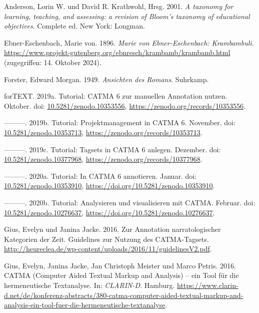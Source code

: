 \documentclass[
          a4paper,
        ]{article}
\newlength{\cslhangindent}
\newenvironment{CSLReferences}[2] %
 {\begin{list}{}{%
  \setlength{\itemindent}{0pt}
  \setlength{\leftmargin}{0pt}
  \setlength{\parsep}{0pt}
  \ifodd #1
   \setlength{\leftmargin}{\cslhangindent}
   \setlength{\itemindent}{-1\cslhangindent}
  \fi
  \setlength{\itemsep}{#2\baselineskip}}}
 {\end{list}}
\begin{document}
\label{refs}
\begin{CSLReferences}{1}{0}
Anderson, Lorin W. und David R. Krathwohl, Hrsg. 2001. \emph{A taxonomy
for learning, teaching, and assessing: a revision of {Bloom}'s taxonomy
of educational objectives}. Complete ed. New York: Longman.

Ebner-Eschenbach, Marie von. 1896. \emph{Marie von {Ebner}-{Eschenbach}:
{Krambambuli}}.
\url{https://www.projekt-gutenberg.org/ebnresch/krambamb/krambamb.html}
(zugegriffen: 14. Oktober 2024).

Forster, Edward Morgan. 1949. \emph{Ansichten des Romans}. Suhrkamp.

forTEXT. 2019a. Tutorial: {CATMA} 6 zur manuellen {Annotation} nutzen.
Oktober. doi:
\href{https://doi.org/10.5281/zenodo.10353556}{10.5281/zenodo.10353556},
\url{https://zenodo.org/records/10353556}.

---------. 2019b. Tutorial: {Projektmanagement} in {CATMA} 6. November.
doi:
\href{https://doi.org/10.5281/zenodo.10353713}{10.5281/zenodo.10353713},
\url{https://zenodo.org/records/10353713}.

---------. 2019c. Tutorial: {Tagsets} in {CATMA} 6 anlegen. Dezember.
doi:
\href{https://doi.org/10.5281/zenodo.10377968}{10.5281/zenodo.10377968},
\url{https://zenodo.org/records/10377968}.

---------. 2020a. Tutorial: {In} {CATMA} 6 annotieren. Januar. doi:
\href{https://doi.org/10.5281/zenodo.10353910}{10.5281/zenodo.10353910},
\url{https://doi.org/10.5281/zenodo.10353910}.

---------. 2020b. Tutorial: {Analysieren} und visualisieren mit {CATMA}.
Februar. doi:
\href{https://doi.org/10.5281/zenodo.10276637}{10.5281/zenodo.10276637},
\url{https://doi.org/10.5281/zenodo.10276637}.

Gius, Evelyn und Janina Jacke. 2016. Zur {Annotation} narratologischer
{Kategorien} der {Zeit}. {Guidelines} zur {Nutzung} des
{CATMA}-{Tagsets}.
\url{http://heureclea.de/wp-content/uploads/2016/11/guidelinesV2.pdf}.

Gius, Evelyn, Janina Jacke, Jan Christoph Meister und Marco Petris.
2016. {CATMA} ({Computer} {Aided} {Textual} {Markup} and {Analysis}) --
ein {Tool} für die hermeneutische {Textanalyse}. In:
\emph{{CLARIN}-{D}}. Hamburg.
\url{https://www.clarin-d.net/de/konferenz-abstracts/380-catma-computer-aided-textual-markup-and-analysis-ein-tool-fuer-die-hermeneutische-textanalyse}.


\end{CSLReferences}
\end{document}
